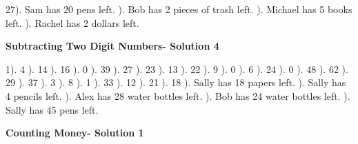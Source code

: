 \documentclass{article}%
\begin{document}
27). Sam has 20 pens left.%
). Bob has 2 pieces of trash left.%
). Michael has 5 books left.%
). Rachel has 2 dollars left.%
\newline%
\newpage%
\large%
\begin{center}%
\textbf{Subtracting Two Digit Numbers- Solution 4}%
\newline%
\end{center} \normalsize%
1). 4%
). 14%
). 16%
). 0%
). 39%
). 27%
). 23%
). 13%
). 22%
). 9%
). 0%
). 6%
). 24%
). 0%
). 48%
). 62%
). 29%
). 37%
). 3%
). 8%
). 1%
). 33%
). 12%
). 21%
). 18%
). Sally has 18 papers left.%
). Sally has 4 pencils left.%
). Alex has 28 water bottles left.%
). Bob has 24 water bottles left.%
). Sally has 45 pens left.%
\newline%
\newpage%
\large%
\begin{center}%
\textbf{Counting Money- Solution 1}%
\newline%
\end{center} \normalsize%
\end{document}
